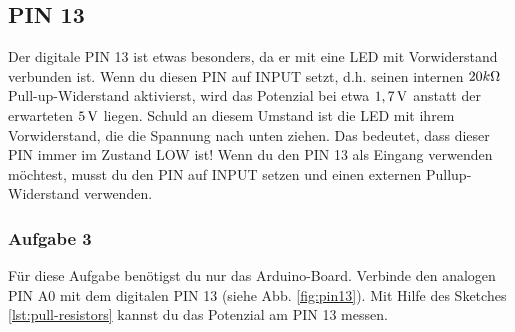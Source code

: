 \subsection{PIN 13}

Der digitale PIN 13 ist etwas besonders, da er mit eine LED mit Vorwiderstand verbunden ist. Wenn du diesen PIN auf INPUT setzt, d.h. seinen internen $20k\Omega$ Pull-up-Widerstand aktivierst, wird das Potenzial bei etwa $1,7\operatorname{V}$ anstatt der erwarteten $5\operatorname{V}$ liegen. Schuld an diesem Umstand ist die LED mit ihrem Vorwiderstand, die die Spannung nach unten ziehen. Das bedeutet, dass dieser PIN immer im Zustand LOW ist! Wenn du den PIN 13 als Eingang verwenden möchtest, musst du den PIN auf INPUT setzen und einen externen Pullup-Widerstand verwenden.



\subsubsection{Aufgabe 3} 
Für diese Aufgabe benötigst du nur das Arduino-Board. Verbinde den analogen PIN A0 mit dem digitalen PIN 13  (siehe Abb. \ref{fig:pin13}). Mit Hilfe des Sketches \ref{lst:pull-resistors} kannst du das Potenzial am PIN 13 messen. 



